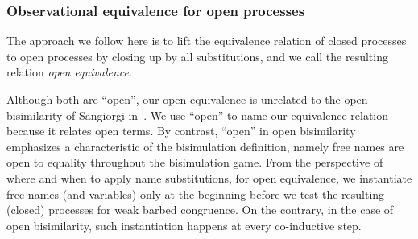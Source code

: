 \documentclass{LMCS}
\renewcommand{\_}{\mathord{\rule[-.25ex]{1ex}{.15ex}}}
\begin{document}
\subsubsection{Observational equivalence for open processes}
The approach we follow here is to lift the equivalence relation of
closed processes to open processes by closing up by all substitutions,
and we call the resulting relation \emph{open equivalence}.

Although both are ``open'', our open equivalence is
unrelated to the open bisimilarity of Sangiorgi
in~\cite{Sangiorgi96OpenBisi}. We use ``open'' to name our equivalence
relation because it relates
open terms. By contrast, ``open'' in open
bisimilarity emphasizes a characteristic of the bisimulation
definition, namely free names are open to equality throughout the
bisimulation game. From the perspective of where and when to apply
name substitutions, for open equivalence, we instantiate free names
(and variables) only at the beginning before we test the resulting (closed)
processes for weak barbed congruence.
On the contrary, in the case of open bisimilarity, such instantiation
happens at every co-inductive step.
\iffalse It is to be noticed
that our approach is similar to one that is often followed
for defining congruence relations from non-congruent
bisimilarity definitions: preliminary closure under all contexts.\fi
\end{document}
